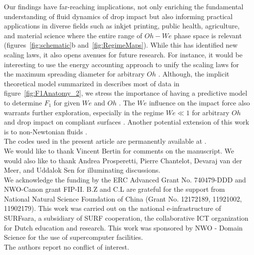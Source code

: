 \documentclass{jfm}
\begin{document}
Our findings have far-reaching implications, not only enriching the fundamental understanding of fluid dynamics of drop impact but also informing practical applications in diverse fields such as inkjet printing, public health, agriculture, and material science where the entire range of $Oh-We$ phase space is relevant (figures~\ref{fig:schematic}b and~\ref{fig:RegimeMaps}). While this has identified new scaling laws, it also opens avenues for future research. For instance, it would be interesting to use the energy accounting approach to unify the scaling laws for the maximum spreading diameter for arbitrary $Oh$ \citep{laan2014maximum, Wildeman2016}. Although, the implicit theoretical model summarized in \citet{cheng2021drop} describes most of data in figure~\ref{fig:F1Anatomy_2}, we stress the importance of having a predictive model to determine $F_1$ for given $We$ and $Oh$ \citep{sanjay2024PRL}. The $We$ influence on the impact force also warrants further exploration, especially in the regime $We \ll 1$ for arbitrary $Oh$ \citep{chevy2012liquid, molavcek2012quasi} and drop impact on compliant surfaces \citep{alventosa_cimpeanu_harris_2023, ma2023scaling}. Another potential extension of this work is to non-Newtonian fluids \citep{martouzet2021dynamic, aguero2022impact, bertin2023similarity, jin2023marbles}.\\[5mm] 

 The codes used in the present article are permanently available at \citet{vatsal_sanjay_2023_7598181}.\\

  We would like to thank Vincent Bertin for comments on the manuscript. We would also like to thank Andrea Prosperetti, Pierre Chantelot, Devaraj van der Meer, and Uddalok Sen for illuminating discussions.\\

 We acknowledge the funding by the ERC Advanced Grant No. 740479-DDD and NWO-Canon grant FIP-II. B.Z and C.L are grateful for the support from National Natural Science Foundation of China (Grant No. 12172189, 11921002, 11902179). This work was carried out on the national e-infrastructure of SURFsara, a subsidiary of SURF cooperation, the collaborative ICT organization for Dutch education and research. This work was sponsored by NWO - Domain Science for the use of supercomputer facilities.\\

 The authors report no conflict of interest.\\
\end{document}
